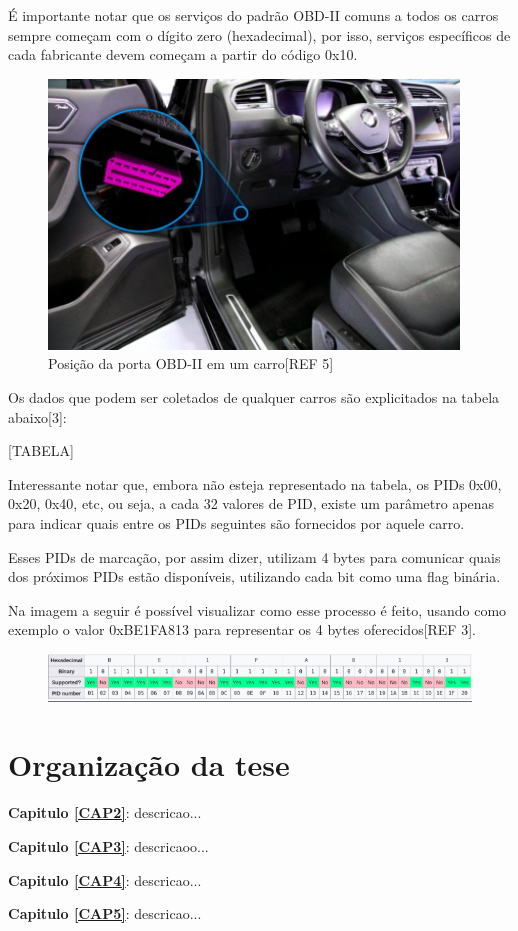 É importante notar que os serviços do padrão OBD-II comuns a todos os carros sempre começam com o dígito zero (hexadecimal), por isso, serviços específicos de cada fabricante devem começam a partir do código 0x10.

\begin{figure}[hp]
    \centering
    
    \includegraphics[]{figures/localizacao_obd2.png}
    
    \caption{Posição da porta OBD-II em um carro[REF 5]}
\end{figure}

Os dados que podem ser coletados de qualquer carros são explicitados na tabela abaixo[3]:

[TABELA]

Interessante notar que, embora não esteja representado na tabela, os PIDs 0x00, 0x20, 0x40, etc, ou seja, a cada 32 valores de PID, existe um parâmetro apenas para indicar quais entre os PIDs seguintes são fornecidos por aquele carro.

Esses PIDs de marcação, por assim dizer, utilizam 4 bytes para comunicar quais dos próximos PIDs estão disponíveis, utilizando cada bit como uma flag binária. 

Na imagem a seguir é possível visualizar como esse processo é feito, usando como exemplo o valor 0xBE1FA813 para representar os 4 bytes oferecidos[REF 3].

\begin{figure}[hp]
    \centering
    
    \includegraphics[scale=0.7]{figures/tabela_dados_disponiveis.png}
    
    \caption{}
\end{figure}


\section{Organização da tese}

\noindent \textbf{Capitulo \ref{CAP2}}: descricao...

\noindent \textbf{Capitulo \ref{CAP3}}: descricaoo...

\noindent \textbf{Capitulo \ref{CAP4}}: descricao...

\noindent \textbf{Capitulo \ref{CAP5}}: descricao...